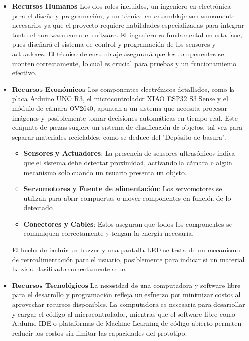 \begin{itemize}
    \item \textbf{Recursos Humanos}  
    Los dos roles incluidos, un ingeniero en electrónica para el diseño y programación, y un técnico en ensamblaje son sumamente necesarios ya que el proyecto requiere habilidades especializadas para integrar tanto el hardware como el software. El ingeniero es fundamental en esta fase, pues diseñará el sistema de control y programación de los sensores y actuadores. El técnico de ensamblaje asegurará que los componentes se monten correctamente, lo cual es crucial para pruebas y un funcionamiento efectivo.

    \item \textbf{Recursos Económicos}  
    Los componentes electrónicos detallados, como la placa Arduino UNO R3, el microcontrolador XIAO ESP32 S3 Sense y el módulo de cámara OV2640, apuntan a un sistema que necesita procesar imágenes y posiblemente tomar decisiones automáticas en tiempo real. Este conjunto de piezas sugiere un sistema de clasificación de objetos, tal vez para separar materiales reciclables, como se deduce del "Depósito de basura".

    \begin{itemize}
        \item \textbf{Sensores y Actuadores}: La presencia de sensores ultrasónicos indica que el sistema debe detectar proximidad, activando la cámara o algún mecanismo solo cuando un usuario presenta un objeto.
        \item \textbf{Servomotores y Fuente de alimentación}: Los servomotores se utilizan para abrir compuertas o mover componentes en función de lo detectado.
        \item \textbf{Conectores y Cables}: Estos aseguran que todos los componentes se comuniquen correctamente y tengan la energía necesaria.
    \end{itemize}

    El hecho de incluir un buzzer y una pantalla LED se trata de un mecanismo de retroalimentación para el usuario, posiblemente para indicar si un material ha sido clasificado correctamente o no.

    \item \textbf{Recursos Tecnológicos}  
    La necesidad de una computadora y software libre para el desarrollo y programación refleja un esfuerzo por minimizar costos al aprovechar recursos disponibles. La computadora es necesaria para desarrollar y cargar el código al microcontrolador, mientras que el software libre como Arduino IDE o plataformas de Machine Learning de código abierto permiten reducir los costos sin limitar las capacidades del prototipo.


\end{itemize}
